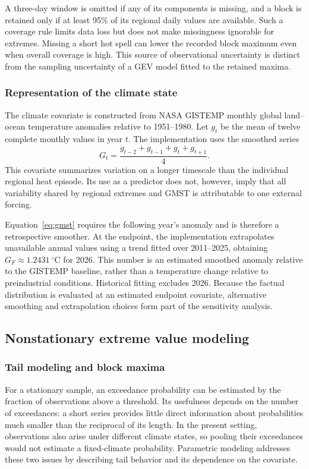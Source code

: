 \documentclass[11pt]{article}
\begin{document}
A three-day window is omitted if any of its components is missing, and
a block is retained only if at least 95\% of its regional daily values
are available. Such a coverage rule limits data loss but does not make
missingness ignorable for extremes. Missing a short hot spell can lower
the recorded block maximum even when overall coverage is high. This
source of observational uncertainty is distinct from the sampling
uncertainty of a GEV model fitted to the retained maxima.

\subsubsection{Representation of the climate state}
The climate covariate is constructed from NASA GISTEMP monthly global
land--ocean temperature anomalies relative to 1951--1980. Let $g_t$ be
the mean of twelve complete monthly values in year $t$. The implementation
uses the smoothed series
\begin{equation}
G_t=\frac{g_{t-2}+g_{t-1}+g_t+g_{t+1}}{4}.
\label{eq:gmst}
\end{equation}
This covariate summarizes variation on a longer timescale than the
individual regional heat episode. Its use as a predictor does not,
however, imply that all variability shared by regional extremes and
GMST is attributable to one external forcing.

Equation~\eqref{eq:gmst} requires the following year's anomaly and is
therefore a retrospective smoother. At the endpoint, the implementation
extrapolates unavailable annual values using a trend fitted over
2011--2025, obtaining $G_F\approx1.2431\ ^{\circ}\mathrm{C}$ for 2026.
This number is an estimated smoothed anomaly relative to the GISTEMP
baseline, rather than a temperature change relative to preindustrial
conditions. Historical fitting excludes 2026. Because the factual
distribution is evaluated at an estimated endpoint covariate, alternative
smoothing and extrapolation choices form part of the sensitivity analysis.

\subsection{Nonstationary extreme value modeling}
\label{sec:model}
\subsubsection{Tail modeling and block maxima}
For a stationary sample, an exceedance probability can be estimated by
the fraction of observations above a threshold. Its usefulness depends
on the number of exceedances: a short series provides little direct
information about probabilities much smaller than the reciprocal of
its length. In the present setting, observations also arise under
different climate states, so pooling their exceedances would not estimate
a fixed-climate probability. Parametric modeling addresses these two
issues by describing tail behavior and its dependence on the covariate.
\end{document}
